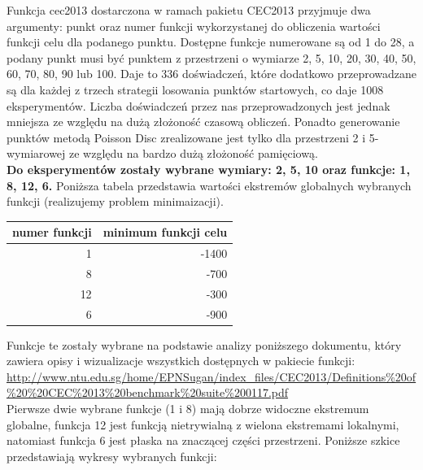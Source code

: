 \documentclass{article}
\begin{document}
Funkcja cec2013 dostarczona w ramach pakietu CEC2013 przyjmuje dwa argumenty: punkt oraz numer funkcji wykorzystanej do obliczenia wartości funkcji celu dla podanego punktu. Dostępne funkcje numerowane są od 1 do 28, a podany punkt musi być punktem z przestrzeni o wymiarze 2, 5, 10, 20, 30, 40, 50, 60, 70, 80, 90 lub 100. Daje to 336 doświadczeń, które dodatkowo przeprowadzane są dla każdej z trzech strategii losowania punktów startowych, co daje 1008 eksperymentów. Liczba doświadczeń przez nas przeprowadzonych jest jednak mniejsza ze względu na dużą złożoność czasową obliczeń. Ponadto generowanie punktów metodą Poisson Disc zrealizowane jest tylko dla przestrzeni 2 i 5-wymiarowej ze względu na bardzo dużą złożoność pamięciową.\\
\textbf{Do eksperymentów zostały wybrane wymiary: 2, 5, 10 oraz funkcje: 1, 8, 12, 6.} Poniższa tabela przedstawia wartości ekstremów globalnych wybranych funkcji (realizujemy problem minimaizacji).\\
\begin{center}
\begin{tabular}{|r|r|}
  \hline 
  numer funkcji & minimum funkcji celu\\
  \hline 
  1 & -1400\\
  \hline
  8 & -700 \\
  \hline
  12 & -300 \\
  \hline
  6 & -900 \\
  \hline
\end{tabular}
\end{center}
Funkcje te zostały wybrane na podstawie analizy poniższego dokumentu, który zawiera opisy i wizualizacje wszystkich dostępnych w pakiecie funkcji:\\
\url{http://www.ntu.edu.sg/home/EPNSugan/index_files/CEC2013/Definitions%20of%20%20CEC%2013%20benchmark%20suite%200117.pdf} \\
Pierwsze dwie wybrane funkcje (1 i 8) mają dobrze widoczne ekstremum globalne, funkcja 12 jest funkcją nietrywialną z wielona ekstremami lokalnymi, natomiast funkcja 6 jest płaska na znaczącej części przestrzeni.
\newpage
Poniższe szkice przedstawiają wykresy wybranych funkcji:\\
\end{document}
